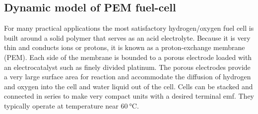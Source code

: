 \documentclass[11pt,a4paper]{article}
\numberwithin{equation}{section}
\theoremstyle{it}
\theoremstyle{definition}
\begin{document}
\subsection{Dynamic model of PEM fuel-cell}
For many practical applications the most satisfactory hydrogen/oxygen fuel cell is built around a solid polymer that serves as an acid electrolyte. Because it is very thin and conducts  ions or protons, it is known as a proton-exchange membrane (PEM). Each side of the membrane is bounded to a porous electrode loaded with an electrocatalyst such as finely divided platinum. The porous electrodes provide a very large surface area for reaction and accommodate the diffusion of hydrogen and oxygen into the cell and water liquid out of the cell. Cells can be stacked and connected in series to make very compact units with a desired terminal emf. They typically operate at temperature near $\SI{60}{\celsius}$.
\end{document}
